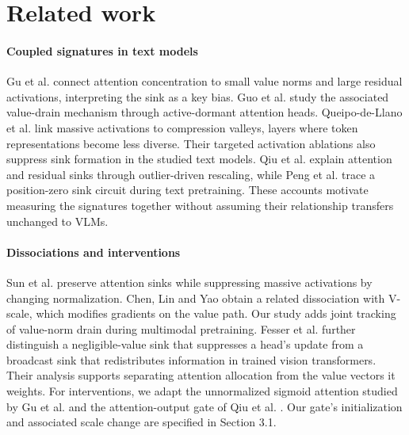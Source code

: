 \documentclass{article}
\begin{document}
\section{Related work}

\paragraph{Coupled signatures in text models} Gu et al. \cite{ref6} connect attention concentration to small value norms and large residual activations, interpreting the sink as a key bias. Guo et al. \cite{ref4} study the associated value-drain mechanism through active-dormant attention heads. Queipo-de-Llano et al. \cite{ref7} link massive activations to compression valleys, layers where token representations become less diverse. Their targeted activation ablations also suppress sink formation in the studied text models. Qiu et al. \cite{ref8} explain attention and residual sinks through outlier-driven rescaling, while Peng et al. \cite{ref24} trace a position-zero sink circuit during text pretraining. These accounts motivate measuring the signatures together without assuming their relationship transfers unchanged to VLMs.

\paragraph{Dissociations and interventions} Sun et al. \cite{ref9} preserve attention sinks while suppressing massive activations by changing normalization. Chen, Lin and Yao \cite{ref10} obtain a related dissociation with V-scale, which modifies gradients on the value path. Our study adds joint tracking of value-norm drain during multimodal pretraining. Fesser et al. \cite{ref23} further distinguish a negligible-value sink that suppresses a head's update from a broadcast sink that redistributes information in trained vision transformers. Their analysis supports separating attention allocation from the value vectors it weights. For interventions, we adapt the unnormalized sigmoid attention studied by Gu et al. \cite{ref6} and the attention-output gate of Qiu et al. \cite{ref20}. Our gate's initialization and associated scale change are specified in Section 3.1.
\end{document}
